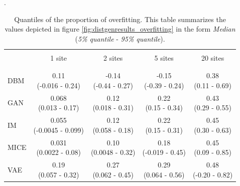 \documentclass[12pt]{article}
\begin{document}
\begin{table}[h]
\centering
\caption{Quantiles of the proportion of overfitting. This table summarizes the values depicted in figure \ref{fig:distgenresults_overfitting} in the form  {\em Median} ({\em 5\% quantile} - {\em 95\% quantile}).}\label{tab:distgenresults_overfitting}.
\begin{tabular}{l|cccc}
\\\\[-4\medskipamount]
& 1 site & 2 sites & 5 sites & 20 sites \\[0.5ex]
\hline
\\\\[-4\medskipamount]
DBM & \makecell{0.11 \\ (-0.016 - 0.24)} & \makecell{-0.14 \\ (-0.44 - 0.27)} & \makecell{-0.15 \\ (-0.39 - 0.24)} & \makecell{0.38 \\ (0.11 - 0.69)} \\[2ex]
GAN & \makecell{0.068 \\ (0.013 - 0.17)} & \makecell{0.12 \\ (0.018 - 0.31)} & \makecell{0.22 \\ (0.15 - 0.34)} & \makecell{0.43 \\ (0.29 - 0.55)} \\[2ex]
IM & \makecell{0.055 \\ (-0.0045 - 0.099)} & \makecell{0.12 \\ (0.058 - 0.18)} & \makecell{0.22 \\ (0.15 - 0.31)} & \makecell{0.45 \\ (0.30 - 0.63)} \\[2ex]
MICE & \makecell{0.031 \\ (0.0022 - 0.08)} & \makecell{0.10 \\ (0.0048 - 0.32)} & \makecell{0.18 \\ (-0.019 - 0.45)} & \makecell{0.45 \\ (0.09 - 0.85)} \\[2ex]
VAE & \makecell{0.19 \\ (0.057 - 0.32)} & \makecell{0.27 \\ (0.062 - 0.45)} & \makecell{0.29 \\ (0.064 - 0.56)} & \makecell{0.48 \\ (-0.20 - 0.82)} \\[2ex]
\end{tabular}
\end{table}
\end{document}

